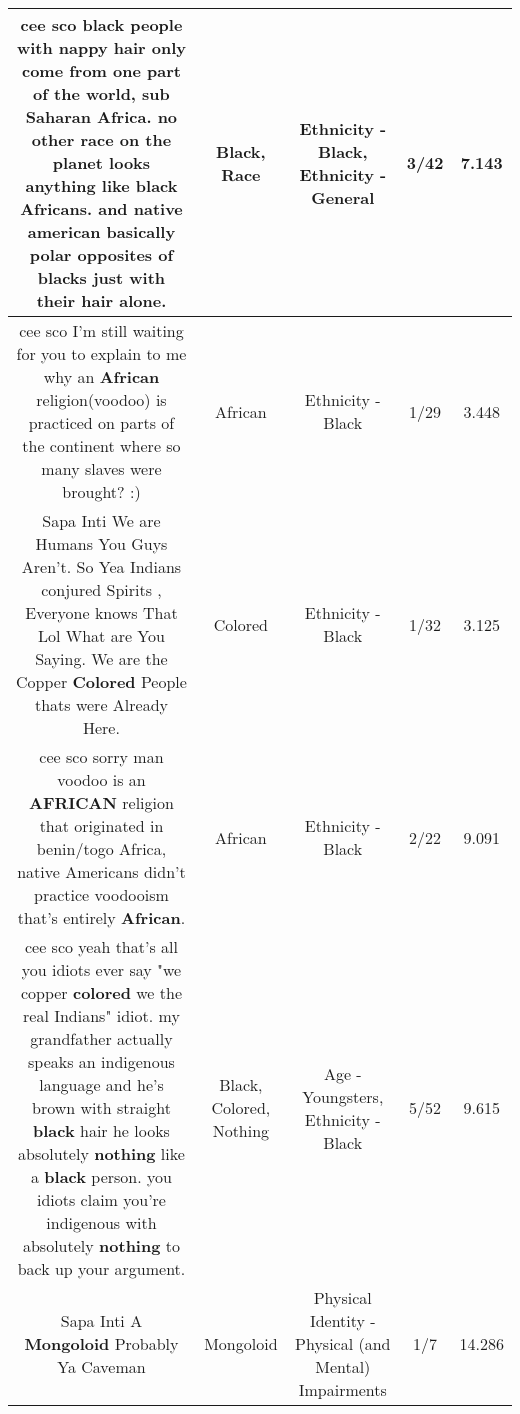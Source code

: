 \documentclass[11pt]{article}
\newlength\mylength
\begin{document}
\begin{center}
\begin{longtable}{|C{.65\mylength}|C{.30\mylength}|C{.12\mylength}|C{.12\mylength}|C{.12\mylength}|}
  \small cee sco \textbf{black} people with nappy hair only come from one part of the world, sub Saharan Africa. no other \textbf{race} on the planet looks anything like \textbf{black} Africans. and native american basically polar opposites of blacks just with their hair alone.\normalsize   & Black, Race & Ethnicity - Black, Ethnicity - General & 3/42 & 7.143 \\  \hline
  \small cee sco I'm still waiting for you to explain to me why an \textbf{African} religion(voodoo) is practiced on parts of the continent where so many slaves were brought? :)\normalsize   & African & Ethnicity - Black & 1/29 & 3.448 \\  \hline
  \small Sapa Inti We are Humans You Guys Aren't. So Yea Indians conjured Spirits , Everyone knows That Lol What are You Saying. We are the Copper \textbf{Colored} People thats were Already Here.\normalsize   & Colored & Ethnicity - Black & 1/32 & 3.125 \\  \hline
  \small cee sco sorry man voodoo is an \textbf{AFRICAN} religion that originated in benin/togo Africa, native Americans didn't practice voodooism that's entirely \textbf{African}.\normalsize   & African & Ethnicity - Black & 2/22 & 9.091 \\  \hline
  \small cee sco yeah that's all you idiots ever say "we copper \textbf{colored} we the real Indians" idiot. my grandfather actually speaks an indigenous language and he's brown with straight \textbf{black} hair he looks absolutely \textbf{nothing} like a \textbf{black} person. you idiots claim you're indigenous with absolutely \textbf{nothing} to back up your argument.\normalsize   & Black, Colored, Nothing & Age - Youngsters, Ethnicity - Black & 5/52 & 9.615 \\  \hline
  \small Sapa Inti A \textbf{Mongoloid} Probably Ya Caveman\normalsize   & Mongoloid & Physical Identity - Physical (and Mental) Impairments & 1/7 & 14.286 \\  \hline

\end{longtable}
\end{center}
\end{document}
